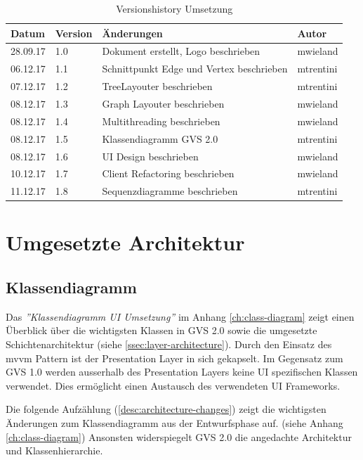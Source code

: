 \documentclass[11pt,a4paper,english,oneside]{book}
\numberwithin{equation}{chapter}
\begin{document}
	\begin{table}[h!]
	\centering
	\begin{tabularx}{\linewidth}{l l X l}
		\toprule 
		Datum & Version & Änderungen & Autor \\
		\midrule
		28.09.17 & 1.0 & Dokument erstellt, Logo beschrieben & mwieland \\
		06.12.17 & 1.1 & Schnittpunkt Edge und Vertex beschrieben & mtrentini \\
		07.12.17 & 1.2 & TreeLayouter beschrieben & mtrentini \\
		08.12.17 & 1.3 & Graph Layouter beschrieben & mwieland \\
		08.12.17 & 1.4 & Multithreading beschrieben & mwieland \\
		08.12.17 & 1.5 & Klassendiagramm GVS 2.0 & mtrentini \\
		08.12.17 & 1.6 & UI Design beschrieben & mwieland \\
		10.12.17 & 1.7 & Client Refactoring beschrieben & mwieland \\
		11.12.17 & 1.8 & Sequenzdiagramme beschrieben & mtrentini \\
		\bottomrule 
	\end{tabularx} 
	\caption{Versionshistory Umsetzung} 
	\end{table}



	\section{Umgesetzte Architektur}
	
	\subsection{Klassendiagramm}
	Das \textit{''Klassendiagramm UI Umsetzung''} im Anhang \ref{ch:class-diagram} zeigt einen Überblick über die wichtigsten Klassen in GVS 2.0 sowie die umgesetzte Schichtenarchitektur (siehe \ref{ssec:layer-architecture}). Durch den Einsatz des \gls{mvvm} Pattern ist der Presentation Layer in sich gekapselt. Im Gegensatz zum GVS 1.0 werden ausserhalb des Presentation Layers keine UI spezifischen Klassen verwendet. Dies ermöglicht einen Austausch des verwendeten UI Frameworks.
	

	\noindent
	Die folgende Aufzählung (\ref{desc:architecture-changes}) zeigt die wichtigsten Änderungen zum Klassendiagramm aus der Entwurfsphase auf. (siehe Anhang \ref{ch:class-diagram}) Ansonsten widerspiegelt GVS 2.0 die angedachte Architektur und Klassenhierarchie.
	
\end{document}
